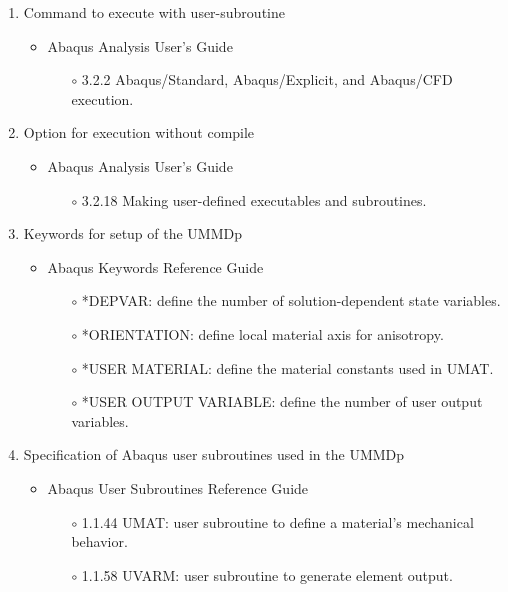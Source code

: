 \documentclass[11pt,a4paper,twoside,final,onecolumn,titlepage]{article}
\begin{document}
\begin{enumerate}
	\item Command to execute with user-subroutine
	 \begin{itemize}
     	\item Abaqus Analysis User's Guide
     	\begin{itemize}
     		\item[$\circ$] 3.2.2 Abaqus/Standard, Abaqus/Explicit, and Abaqus/CFD execution.\\
		\end{itemize}
  	\end{itemize}
  	\item Option for execution without compile
  	\begin{itemize}
     	\item Abaqus Analysis User's Guide
     	\begin{itemize}
     		\item[$\circ$] 3.2.18 Making user-defined executables and subroutines.\\
		\end{itemize}
  	\end{itemize}
  	 \item Keywords for setup of the UMMDp
  	\begin{itemize}
     	\item Abaqus Keywords Reference Guide
     	\begin{itemize}
     		\item[$\circ$] *DEPVAR: define the number of solution-dependent state variables.
     		\item[$\circ$] *ORIENTATION: define local material axis for anisotropy.
     		\item[$\circ$] *USER MATERIAL: define the material constants used in UMAT.
     		\item[$\circ$] *USER OUTPUT VARIABLE: define the number of user output variables.\\
     	\end{itemize}
  	\end{itemize}
  	 \item Specification of Abaqus user subroutines used in the UMMDp
  	\begin{itemize}
     	\item Abaqus User Subroutines Reference Guide
     	\begin{itemize}
     		\item[$\circ$] 1.1.44 UMAT: user subroutine to define a material's mechanical behavior.
     		\item[$\circ$] 1.1.58 UVARM: user subroutine to generate element output.\\

\end{itemize}
\end{itemize}
\end{enumerate}
\end{document}
